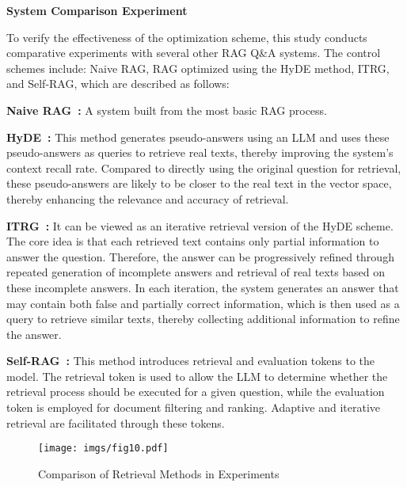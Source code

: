 \textbf{System Comparison Experiment}

To verify the effectiveness of the optimization scheme, this study conducts comparative experiments with several other RAG Q\&A systems. The control schemes include: Naive RAG, RAG optimized using the HyDE method, ITRG, and Self-RAG, which are described as follows:

\textbf{Naive RAG~\cite{gao2023retrieval}:} A system built from the most basic RAG process.

\textbf{HyDE~\cite{gao2022precise}:} This method generates pseudo-answers using an LLM and uses these pseudo-answers as queries to retrieve real texts, thereby improving the system's context recall rate. Compared to directly using the original question for retrieval, these pseudo-answers are likely to be closer to the real text in the vector space, thereby enhancing the relevance and accuracy of retrieval.



\textbf{ITRG~\cite{feng2024retrieval}:} It can be viewed as an iterative retrieval version of the HyDE scheme. The core idea is that each retrieved text contains only partial information to answer the question. Therefore, the answer can be progressively refined through repeated generation of incomplete answers and retrieval of real texts based on these incomplete answers. In each iteration, the system generates an answer that may contain both false and partially correct information, which is then used as a query to retrieve similar texts, thereby collecting additional information to refine the answer.

\textbf{Self-RAG~\cite{asai2023self}:} This method introduces retrieval and evaluation tokens to the model. The retrieval token is used to allow the LLM to determine whether the retrieval process should be executed for a given question, while the evaluation token is employed for document filtering and ranking. Adaptive and iterative retrieval are facilitated through these tokens.

\begin{figure} [h] 
    \centering
    \texttt{[image: imgs/fig10.pdf]}
    \caption{Comparison of Retrieval Methods in Experiments}
    \label{fig:fig10}
\end{figure}


